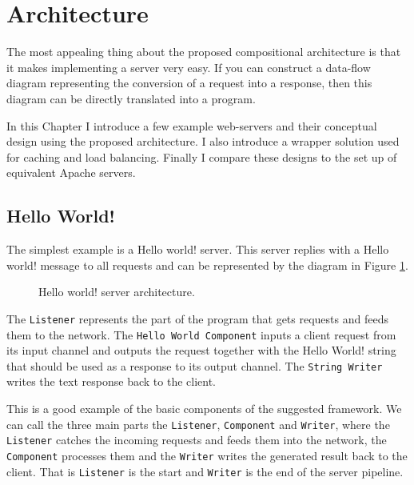 \section{Architecture}
\label{sec:arch}
The most appealing thing about the proposed compositional architecture is that
it makes implementing a server very easy. If you can construct a data-flow diagram 
representing the conversion of a request into a response, then this diagram
can be directly translated into a program.

In this Chapter I introduce a few example web-servers and their conceptual
design using the proposed architecture. I also introduce a wrapper 
solution used for caching and load balancing.
Finally I compare these designs to the set up of equivalent Apache servers.

\subsection{Hello World!}
\label{sec:helloWorld}
The simplest example is a Hello world! server. This server replies with a 
Hello world! message to all requests and can be represented by the diagram
in Figure \ref{fig:helloWorld}.

\begin{figure}[h]
\centering
{}
\caption[scale=1.0]{Hello world! server architecture.}
\label{fig:helloWorld}
\end{figure}

The \texttt{Listener} represents the 
part of the program that gets requests and feeds them to the network.
The \texttt{Hello World Component} inputs a client request from its input channel
and outputs the request together with the Hello World! string that should be 
used as a response to its output channel.
The \texttt{String Writer} writes the text response back to the client.

This is a good example of the basic components of the suggested framework.
We can call the three main parts the \texttt{Listener}, \texttt{Component} 
and \texttt{Writer}, where
the \texttt{Listener} catches the incoming requests and feeds them into the network,
the \texttt{Component} processes them and the \texttt{Writer} writes the generated result 
back to the client. That is \texttt{Listener} is the start and \texttt{Writer}
is the end of the server pipeline.

